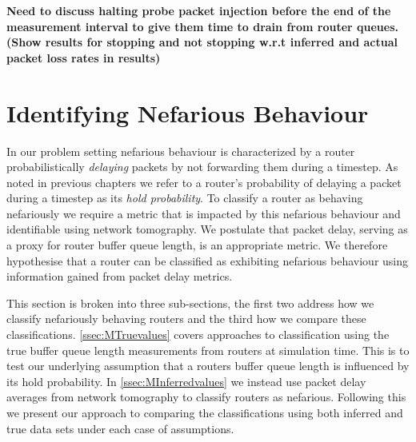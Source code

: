 \textbf{Need to discuss halting probe packet injection before the end of the measurement interval to give them time to drain from router queues. (Show results for stopping and not stopping w.r.t inferred and actual packet loss rates in results)}
    
\section{Identifying Nefarious Behaviour}
\label{sec:MNefidentification}
  In our problem setting nefarious behaviour is characterized by a router probabilistically \textit{delaying} packets by not forwarding them during a timestep. As noted in previous chapters we refer to a router's probability of delaying a packet during a timestep as its \textit{hold probability}. To classify a router as behaving nefariously we require a metric that is impacted by this nefarious behaviour and identifiable using network tomography. We postulate that packet delay, serving as a proxy for router buffer queue length, is an appropriate metric. We therefore hypothesise that a router can be classified as exhibiting nefarious behaviour using information gained from packet delay metrics.\par
  This section is broken into three sub-sections, the first two address how we classify nefariously behaving routers and the third how we compare these classifications. \cref{ssec:MTruevalues} covers approaches to classification using the true buffer queue length measurements from routers at simulation time. This is to test our underlying assumption that a routers buffer queue length is influenced by its hold probability. In \cref{ssec:MInferredvalues} we instead use packet delay averages from network tomography to classify routers as nefarious. Following this we present our approach to comparing the classifications using both inferred and true data sets under each case of assumptions.
  
